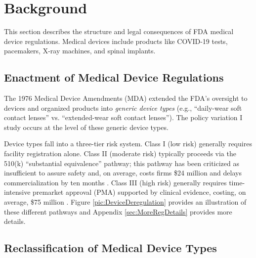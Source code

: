 \documentclass[letterpaper,12pt]{article}
\theoremstyle{definition}
\begin{document}
\section{Background}\label{sec:Background}


This section describes the structure and legal consequences of FDA medical device regulations. Medical devices include products like COVID-19 tests, pacemakers, X-ray machines, and spinal implants.

\subsection{Enactment of Medical Device Regulations}



The 1976 Medical Device Amendments (MDA) extended the FDA's oversight to devices and organized products into \emph{generic device types} (e.g., “daily-wear soft contact lenses” vs. “extended-wear soft contact lenses”). The policy variation I study occurs at the level of these generic device types.


Device types fall into a three-tier risk system. Class I (low risk) generally requires facility registration alone. Class II (moderate risk) typically proceeds via the 510(k) ``substantial equivalence'' pathway; this pathway has been criticized as insufficient to assure safety  and, on average, costs firms \$24 million and delays commercialization by ten months \citep{Makower:2010}.\footnotemark {} Class III (high risk) generally requires time-intensive premarket approval (PMA) supported by clinical evidence, costing, on average, \$75 million \citep{Makower:2010}. Figure \ref{pic:DeviceDeregulation} provides an illustration of these different pathways and Appendix \ref{sec:MoreRegDetails} provides more details.

\subsection{Reclassification of Medical Device Types}
\end{document}

